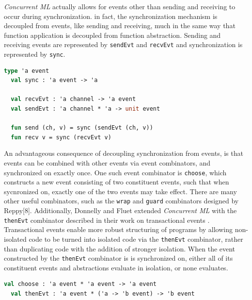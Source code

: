 \documentclass{article}
\begin{document}
\textit{Concurrent ML} actually allows for events other than sending and receiving to
occur during synchronization. in fact, the synchronization mechanism is decoupled from
events, like sending and receiving, much in the same way that function application is decoupled
from function abstraction. Sending and receiving events are represented by \lstinline{sendEvt}
and \lstinline{recvEvt} and synchronization is represented by \lstinline{sync}.

\begin{lstlisting}[language=ML, mathescape]
  type 'a event
  val sync : 'a event -> 'a

  val recvEvt : 'a channel -> 'a event
  val sendEvt : 'a channel * 'a -> unit event

  fun send (ch, v) = sync (sendEvt (ch, v))
  fun recv v = sync (recvEvt v)
  \end{lstlisting}

An advantageous consequence of decoupling synchronization from events, is that events can be
combined with other events via event combinators, and synchronized on exactly once. One such
event combinator is \lstinline{choose}, which constructs a new event consisting of two
constituent events, such that when sycnronized on, exactly one of the two events may take
effect. There are many other useful combinators, such as the \lstinline{wrap} and
\lstinline{guard} combinators designed by Reppy[8]. Additionally, Donnelly and Fluet extended
\textit{Concurrent ML} with the \lstinline{thenEvt} combinator described in their work on
transactional events \cite{transactional_events}. Transactional events enable more robust
structuring of programs by allowing non-isolated code to be turned into isolated code via
the \lstinline{thenEvt} combinator, rather than duplicating code with the addition of stronger
isolation. When the event constructed by the \lstinline{thenEvt} combinator is is synchronized
on, either all of its constituent events and abstractions evaluate in isolation, or none
evaluates.

\begin{lstlisting}[language=ML, mathescape]
  val choose : 'a event * 'a event -> 'a event
  val thenEvt : 'a event * ('a -> 'b event) -> 'b event
  \end{lstlisting}
\end{document}
